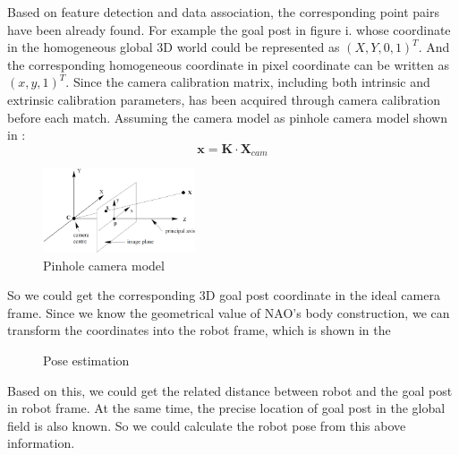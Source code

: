 Based on feature detection and data association, the corresponding point pairs have been already found. For example the goal post in figure i. whose coordinate in the homogeneous global 3D world could be represented as $(X,Y,0,1)^T$. And the corresponding homogeneous coordinate in pixel coordinate can be written as $(x,y,1)^T$. Since the camera calibration matrix, including both intrinsic and extrinsic calibration parameters, has been acquired through camera calibration before each match. Assuming the camera model as pinhole camera model shown in  \cite{hartley2003multiple}: 
\[ %
\mathbf{x} = \mathbf{K} \cdot \mathbf{X}_{cam}
\]
\begin{figure}[!htb]
    \includegraphics[width=0.4\textwidth]{pics/cameramodel.png}
    \centering
    \caption{Pinhole camera model}
    \label{fig: camera}
\end{figure}

So we could get the corresponding 3D goal post coordinate in the ideal camera frame. Since we know the geometrical value of NAO's body construction, we can transform the coordinates into the robot frame, which is shown in the 
\begin{figure}[tbp]
\centering
{}
\caption{Pose estimation}
\label{fig: trans}
\end{figure}
Based on this, we could get the related distance between robot and the goal post in robot frame. At the same time, the precise location of goal post in the global field is also known. So we could calculate the robot pose from this above information.
